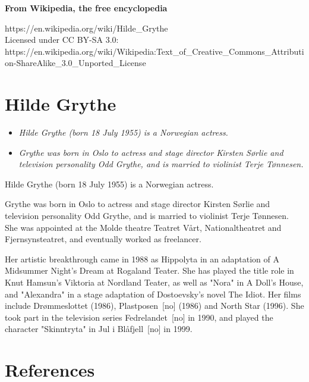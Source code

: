 \textbf{From Wikipedia, the free encyclopedia}

https://en.wikipedia.org/wiki/Hilde\_Grythe\\
Licensed under CC BY-SA 3.0:\\
https://en.wikipedia.org/wiki/Wikipedia:Text\_of\_Creative\_Commons\_Attribution-ShareAlike\_3.0\_Unported\_License

\section{Hilde Grythe}\label{hilde-grythe}

\begin{itemize}
\item
  \emph{Hilde Grythe (born 18 July 1955) is a Norwegian actress.}
\item
  \emph{Grythe was born in Oslo to actress and stage director Kirsten
  Sørlie and television personality Odd Grythe, and is married to
  violinist Terje Tønnesen.}
\end{itemize}

Hilde Grythe (born 18 July 1955) is a Norwegian actress.

Grythe was born in Oslo to actress and stage director Kirsten Sørlie and
television personality Odd Grythe, and is married to violinist Terje
Tønnesen. She was appointed at the Molde theatre Teatret Vårt,
Nationaltheatret and Fjernsynsteatret, and eventually worked as
freelancer.

Her artistic breakthrough came in 1988 as Hippolyta in an adaptation of
A Midsummer Night's Dream at Rogaland Teater. She has played the title
role in Knut Hamsun's Viktoria at Nordland Teater, as well as "Nora" in
A Doll's House, and "Alexandra" in a stage adaptation of Dostoevsky's
novel The Idiot. Her films include Drømmeslottet (1986),
Plastposen~{[}no{]} (1986) and North Star (1996). She took part in the
television series Fedrelandet~{[}no{]} in 1990, and played the character
"Skinntryta" in Jul i Blåfjell~{[}no{]} in 1999.

\section{References}\label{references}
